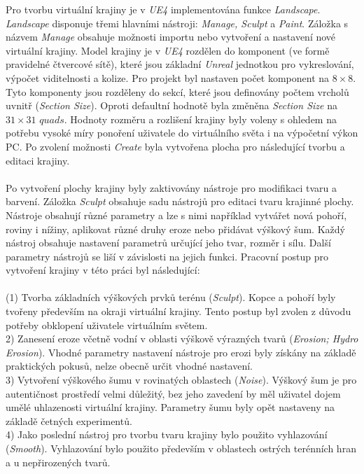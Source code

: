 \documentclass[a4paper, 12pt]{report}
\begin{document}
Pro tvorbu virtuální krajiny je v \textit{UE4} implementována funkce \textit{Landscape}. \textit{Landscape} disponuje třemi hlavními nástroji: \textit{Manage, Sculpt} a \textit{Paint}. Záložka s názvem \textit{Manage} obsahuje možnosti importu nebo vytvoření a nastavení nové virtuální krajiny. Model krajiny je v \textit{UE4} rozdělen do komponent (ve formě pravidelné čtvercové sítě), které jsou základní \textit{Unreal} jednotkou pro vykreslování, výpočet viditelnosti a kolize. Pro projekt byl nastaven počet komponent na $8\times8$. Tyto komponenty jsou rozděleny do sekcí, které jsou definovány počtem vrcholů uvnitř (\textit{Section Size}). Oproti defaultní hodnotě byla změněna \textit{Section Size} na $31\times31$ $quads$. Hodnoty rozměru a rozlišení krajiny byly voleny s ohledem na potřebu vysoké míry ponoření uživatele do virtuálního světa i na výpočetní výkon PC. Po zvolení možnosti \textit{Create} byla vytvořena plocha pro následující tvorbu a editaci krajiny. \\
\\
Po vytvoření plochy krajiny byly zaktivovány nástroje pro modifikaci tvaru a barvení. Záložka \textit{Sculpt} obsahuje sadu nástrojů pro editaci tvaru krajinné plochy. Nástroje obsahují různé parametry a lze s nimi například vytvářet nová pohoří, roviny i nížiny, aplikovat různé druhy eroze nebo přidávat výškový šum. Každý nástroj obsahuje nastavení parametrů určující jeho tvar, rozměr i sílu. Další parametry nástrojů se liší v závislosti na jejich funkci. Pracovní postup pro vytvoření krajiny v této práci byl následující:\\
\\
(1) Tvorba základních výškových prvků terénu (\textit{Sculpt}). Kopce a pohoří byly tvořeny především na okraji virtuální krajiny. Tento postup byl zvolen z důvodu potřeby obklopení uživatele virtuálním světem.\\	
2) Zanesení eroze včetně vodní v oblasti výškově výrazných tvarů (\textit{Erosion; Hydro Erosion}). Vhodné parametry nastavení nástroje pro erozi byly získány na základě praktických pokusů, nelze obecně určit vhodné nastavení.\\	
3) Vytvoření výškového šumu v rovinatých oblastech (\textit{Noise}). Výškový šum je pro autentičnost prostředí velmi důležitý, bez jeho zavedení by měl uživatel dojem umělé uhlazenosti virtuální krajiny. Parametry šumu byly opět nastaveny na základě četných experimentů.\\	4) Jako poslední nástroj pro tvorbu tvaru krajiny bylo použito vyhlazování (\textit{Smooth}). Vyhlazování bylo použito především v oblastech ostrých terénních hran a u nepřirozených tvarů.\\
\end{document}
